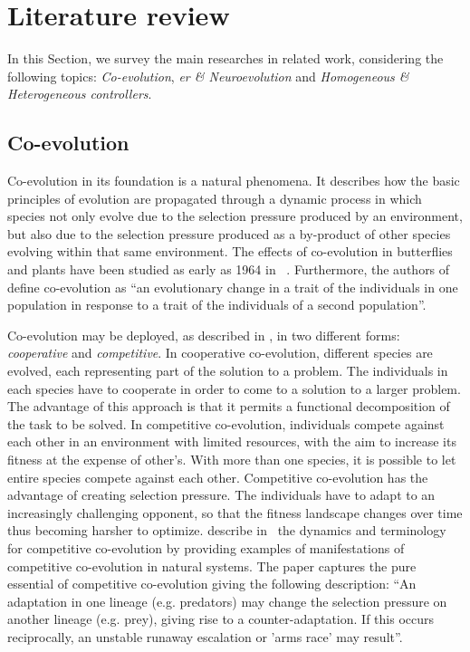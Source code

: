 \documentclass[conference]{IEEEtran}
\begin{document}
\section{Literature review}
\label{sec:lit_review}
In this Section, we survey the main researches in related work, considering the following topics: \textit{Co-evolution}, \textit{\acrlong{er} \& Neuroevolution} and \textit{Homogeneous \& Heterogeneous controllers}.
 
\subsection{Co-evolution}
Co-evolution in its foundation is a natural phenomena.
It describes how the basic principles of evolution are propagated through a dynamic process in which species not only evolve due to the selection pressure produced by an environment, but also due to the selection pressure produced as a by-product of other species evolving within that same environment.
The effects of co-evolution in butterflies and plants have been studied as early as 1964 in ~\cite{ehrlich1964butterflies}.
Furthermore, the authors of ~\cite{janzen1980coevolution} define co-evolution as ``an evolutionary change in a trait of the individuals in one population in response to a trait of the individuals of a second population''. 

Co-evolution may be deployed, as described in \cite{eiben2003introduction}, in two different forms: \textit{cooperative} and \textit{competitive}.
In cooperative co-evolution, different species are evolved, each representing part of the solution to a problem.
The individuals in each species have to cooperate in order to come to a solution to a larger problem.
The advantage of this approach is that it permits a functional decomposition of the task to be solved.
In competitive co-evolution, individuals compete against each other in an environment with limited resources, with the aim to increase its fitness at the expense of other's.
With more than one species, it is possible to let entire species compete against each other.
Competitive co-evolution has the advantage of creating selection pressure.
The individuals have to adapt to an increasingly challenging opponent, so that the fitness landscape changes over time thus becoming harsher to optimize.
\citeauthor{dawkins1979arms} describe in~\cite{dawkins1979arms} the dynamics and terminology for competitive co-evolution by providing examples of manifestations of competitive co-evolution in natural systems.
The paper captures the pure essential of competitive co-evolution giving the following description: ``An adaptation in one lineage (e.g. predators) may change the selection pressure on another lineage (e.g. prey), giving rise to a counter-adaptation. If this occurs reciprocally, an unstable runaway escalation or 'arms race' may result''.
\end{document}
